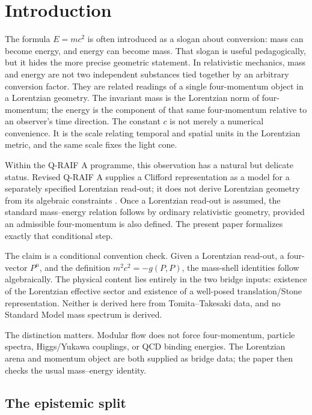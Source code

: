 \documentclass[12pt,a4paper]{article}
\theoremstyle{definition}
\theoremstyle{remark}
\begin{document}
\section{Introduction}
\label{sec:introduction}

The formula $E=mc^2$ is often introduced as a slogan about conversion: mass can become energy, and energy can become mass. That slogan is useful pedagogically, but it hides the more precise geometric statement. In relativistic mechanics, mass and energy are not two independent substances tied together by an arbitrary conversion factor. They are related readings of a single four-momentum object in a Lorentzian geometry. The invariant mass is the Lorentzian norm of four-momentum; the energy is the component of that same four-momentum relative to an observer's time direction. The constant $c$ is not merely a numerical convenience. It is the scale relating temporal and spatial units in the Lorentzian metric, and the same scale fixes the light cone.

Within the Q-RAIF A programme, this observation has a natural but delicate status. Revised Q-RAIF A supplies a Clifford representation as a model for a separately specified Lorentzian read-out; it does not derive Lorentzian geometry from its algebraic constraints \cite{Liu2026QRAIFA}. Once a Lorentzian read-out is assumed, the standard mass--energy relation follows by ordinary relativistic geometry, provided an admissible four-momentum is also defined. The present paper formalizes exactly that conditional step.

The claim is a conditional convention check.  Given a Lorentzian read-out, a four-vector $P^\mu$, and the definition $m^2c^2=-g(P,P)$, the mass-shell identities follow algebraically.  The physical content lies entirely in the two bridge inputs: existence of the Lorentzian effective sector and existence of a well-posed translation/Stone representation.  Neither is derived here from Tomita--Takesaki data, and no Standard Model mass spectrum is derived.

The distinction matters. Modular flow does not force four-momentum, particle spectra, Higgs/Yukawa couplings, or QCD binding energies.  The Lorentzian arena and momentum object are both supplied as bridge data; the paper then checks the usual mass--energy identity.

\subsection{The epistemic split}
\end{document}
